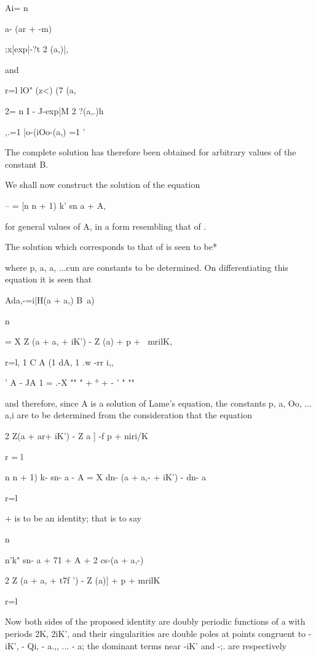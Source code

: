 {{{{{{{{Ai= n

a- (ar + -m)

;x[exp|-?t 2 (a,)|,

and

r=l lO" (z<) (7 (a,

 2= n I - J-exp|M 2 ?(a,.)h

,.=1 |o-(iOo-(a,) =1 '

The complete solution has therefore been obtained for arbitrary values
of the constant B.

%
%

We shall
now construct the solution of the equation

-- = [n n + 1) k' sn a + A,

for general values of A, in a form resembling that of .

The solution which corresponds to that of  is seen to be*

where p, a, a, ...cun are constants to be determined. On
differentiating this equation it is seen that

Ada,-=i|H(a + a,) B\ a)\ \

n

= X Z (a + a, + iK') - Z (a) + p + \ mrilK,

r=l, 1 C A (1 dA, 1 .w -rr i,,

   ' A - JA 1 = .-X "" " + ° + - ' " ""

and therefore, since A is a solution of Lame's equation, the constants
p, a, Oo, ... a,i are to be determined from the consideration that
the equation

2 Z(a + ar+ iK') - Z a ] -f p + niri/K

r = l

n n + 1) k- sn- a - A = X dn- (a + a,- + iK') - dn- a

r=l

+ is to be an identity; that is to say

n

n'k" sn- a + 71 + A + 2 cs-(a + a,-)

2 Z (a + a, + t7f ') - Z (a)] + p + mrilK

r=l

Now both sides of the proposed identity are doubly periodic functions
of a with periods 2K, 2iK', and their singularities are double poles
at points congruent to -iK', - Qi, - a.,, ... - a; the dominant terms
near -iK' and -;. are respectively

}}}}}}}}
